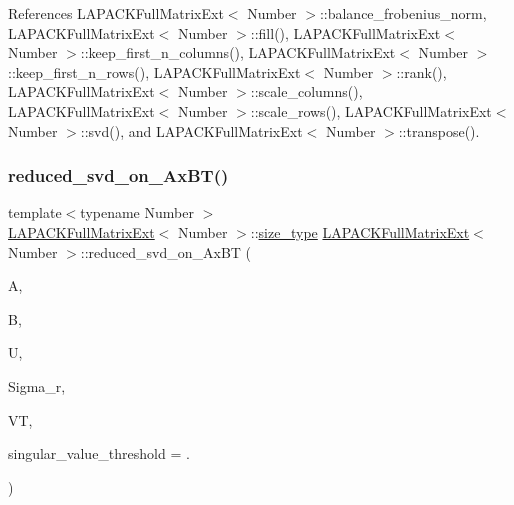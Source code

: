 References L\+A\+P\+A\+C\+K\+Full\+Matrix\+Ext$<$ Number $>$\+::balance\+\_\+frobenius\+\_\+norm, L\+A\+P\+A\+C\+K\+Full\+Matrix\+Ext$<$ Number $>$\+::fill(), L\+A\+P\+A\+C\+K\+Full\+Matrix\+Ext$<$ Number $>$\+::keep\+\_\+first\+\_\+n\+\_\+columns(), L\+A\+P\+A\+C\+K\+Full\+Matrix\+Ext$<$ Number $>$\+::keep\+\_\+first\+\_\+n\+\_\+rows(), L\+A\+P\+A\+C\+K\+Full\+Matrix\+Ext$<$ Number $>$\+::rank(), L\+A\+P\+A\+C\+K\+Full\+Matrix\+Ext$<$ Number $>$\+::scale\+\_\+columns(), L\+A\+P\+A\+C\+K\+Full\+Matrix\+Ext$<$ Number $>$\+::scale\+\_\+rows(), L\+A\+P\+A\+C\+K\+Full\+Matrix\+Ext$<$ Number $>$\+::svd(), and L\+A\+P\+A\+C\+K\+Full\+Matrix\+Ext$<$ Number $>$\+::transpose().

\mbox{\label{classLAPACKFullMatrixExt_a355ed6360b21081b6e86e09833bf95db}} 
\subsubsection{\texorpdfstring{reduced\+\_\+svd\+\_\+on\+\_\+\+Ax\+B\+T()}{reduced\_svd\_on\_AxBT()}\hspace{0.1cm}{\footnotesize\ttfamily [1/3]}}
{\footnotesize\ttfamily template$<$typename Number $>$ \\
\hyperlink{classLAPACKFullMatrixExt}{L\+A\+P\+A\+C\+K\+Full\+Matrix\+Ext}$<$ Number $>$\+::\hyperlink{classLAPACKFullMatrixExt_a5cf5f4a6104dc17029210b5ca52bf574}{size\+\_\+type} \hyperlink{classLAPACKFullMatrixExt}{L\+A\+P\+A\+C\+K\+Full\+Matrix\+Ext}$<$ Number $>$\+::reduced\+\_\+svd\+\_\+on\+\_\+\+Ax\+BT (\begin{DoxyParamCaption}\item[{\hyperlink{classLAPACKFullMatrixExt}{L\+A\+P\+A\+C\+K\+Full\+Matrix\+Ext}$<$ Number $>$ \&}]{A,  }\item[{\hyperlink{classLAPACKFullMatrixExt}{L\+A\+P\+A\+C\+K\+Full\+Matrix\+Ext}$<$ Number $>$ \&}]{B,  }\item[{\hyperlink{classLAPACKFullMatrixExt}{L\+A\+P\+A\+C\+K\+Full\+Matrix\+Ext}$<$ Number $>$ \&}]{U,  }\item[{std\+::vector$<$ typename numbers\+::\+Number\+Traits$<$ Number $>$\+::real\+\_\+type $>$ \&}]{Sigma\+\_\+r,  }\item[{\hyperlink{classLAPACKFullMatrixExt}{L\+A\+P\+A\+C\+K\+Full\+Matrix\+Ext}$<$ Number $>$ \&}]{VT,  }\item[{Number}]{singular\+\_\+value\+\_\+threshold = {.} }\end{DoxyParamCaption})\hspace{0.3cm}{\ttfamily [static]}}


